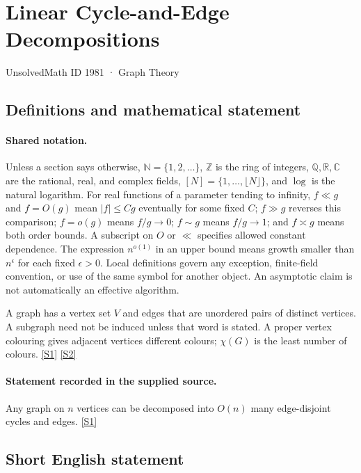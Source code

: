 \documentclass[11pt,a4paper]{article}
\newcommand{\N}{\mathbb{N}}
\newcommand{\Z}{\mathbb{Z}}
\newcommand{\Q}{\mathbb{Q}}
\newcommand{\R}{\mathbb{R}}
\newcommand{\C}{\mathbb{C}}
\newcommand{\sref}[2]{\hyperlink{source:#1:#2}{[S#2]}}
\begin{document}

\setcounter{section}{1980}

\section{Linear Cycle-and-Edge Decompositions}\label{1981}

{\small\sffamily UnsolvedMath ID 1981 · Graph Theory}

\subsection{Definitions and mathematical statement}

\paragraph{Shared notation.}Unless a section says otherwise, $\N=\{1,2,\ldots\}$,
$\Z$ is the ring of integers, $\Q,\R,\C$ are the rational, real, and complex
fields, $[N]=\{1,\ldots,\lfloor N\rfloor\}$, and $\log$ is the natural
logarithm. For real functions of a parameter tending to infinity,
$f\ll g$ and $f=O(g)$ mean $|f|\leq Cg$ eventually for some fixed $C$;
$f\gg g$ reverses this comparison; $f=o(g)$ means $f/g\to0$;
$f\sim g$ means $f/g\to1$; and $f\asymp g$ means both order bounds.
A subscript on $O$ or $\ll$ specifies allowed constant dependence.
The expression $n^{o(1)}$ in an upper bound means growth smaller than
$n^\epsilon$ for each fixed $\epsilon>0$. Local definitions govern any
exception, finite-field convention, or use of the same symbol for another
object. An asymptotic claim is not automatically an effective algorithm.



A graph has a vertex set $V$ and edges that are unordered pairs of distinct vertices. A subgraph need not be induced unless that word is stated. A proper vertex colouring gives adjacent vertices different colours; $\chi(G)$ is the least number of colours. \sref{1981}{1} \sref{1981}{2}

\paragraph{Statement recorded in the supplied source.}
Any graph on $n$ vertices can be decomposed into $O(n)$ many edge-disjoint cycles and edges. \sref{1981}{1}

\subsection{Short English statement}
\end{document}
